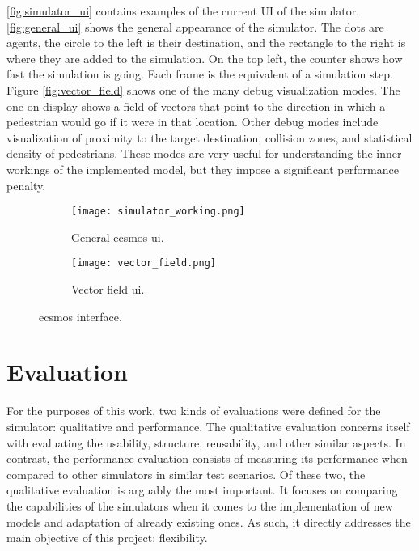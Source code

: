 \documentclass[twoside, 11pt]{article}
\begin{document}
\autoref{fig:simulator_ui} contains examples of the current UI of the simulator. \autoref{fig:general_ui} shows the general appearance of the simulator. The dots are agents, the circle to the left is their destination, and the rectangle to the right is where they are added to the simulation. On the top left, the counter shows how fast the simulation is going. Each frame is the equivalent of a simulation step. Figure \autoref{fig:vector_field} shows one of the many debug visualization modes. The one on display shows a field of vectors that point to the direction in which a pedestrian would go if it were in that location. Other debug modes include visualization of proximity to the target destination, collision zones, and statistical density of pedestrians. These modes are very useful for understanding the inner workings of the implemented model, but they impose a significant performance penalty.

\begin{figure}[h]
  \centering
  \begin{subfigure}{.5\textwidth}
    \centering
    \texttt{[image: simulator\_working.png]}
    \caption[General \gls{ecsmos} \gls{ui}]{General \gls{ecsmos} \gls{ui}.}
    \label{fig:general_ui}
  \end{subfigure}%
  \begin{subfigure}{.5\textwidth}
    \centering
    \texttt{[image: vector\_field.png]}
    \caption[Vector field \gls{ui}]{Vector field \gls{ui}.}
    \label{fig:vector_field}
  \end{subfigure}%
  \caption[\gls{ecsmos} interface]{\gls{ecsmos} interface.} 
  \label{fig:simulator_ui}
\end{figure}

\section{Evaluation} \label{sec:evaluation}

For the purposes of this work, two kinds of evaluations were defined for the simulator: qualitative and performance. The qualitative evaluation concerns itself with evaluating the usability, structure, reusability, and other similar aspects. In contrast, the performance evaluation consists of measuring its performance when compared to other simulators in similar test scenarios.  Of these two, the qualitative evaluation is arguably the most important. It focuses on comparing the capabilities of the simulators when it comes to the implementation of new models and adaptation of already existing ones. As such, it directly addresses the main objective of this project: flexibility. 
\end{document}
